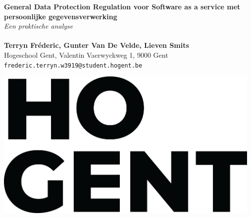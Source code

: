 \documentclass[a0,portrait]{a0poster}
\begin{document}


\begin{minipage}[t]{0.75\linewidth}
\VeryHuge \color{HoGentAccent1} \textbf{General Data Protection Regulation voor Software as a service met persoon\-lijke gegevensverwerking} \color{Black}\\ %
\Huge\textit{Een praktische analyse\\}\\[2.4cm] %
\huge \textbf{Terryn Fréderic, Gunter Van De Velde, Lieven Smits}\\[0.5cm] %
\huge Hogeschool Gent, Valentin Vaerwyckweg 1, 9000 Gent\\[0.4cm] %
\Large \texttt{frederic.terryn.w3919@student.hogent.be} \\
\end{minipage}
%
\begin{minipage}[t]{0.25\linewidth}
\includegraphics[width=13cm,right]{figures/HOGENT_Logo_Pos_rgb.png} 

\end{minipage}

\vspace{1cm} %

\end{document}
